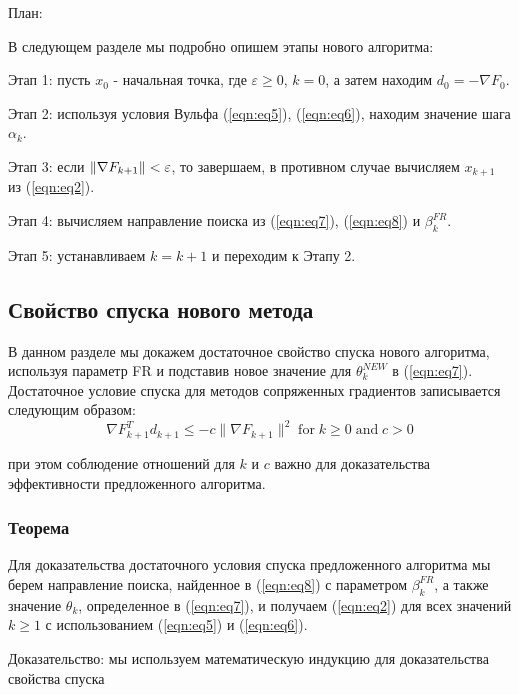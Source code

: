 \noindent План:

\noindent В следующем разделе мы подробно опишем этапы нового алгоритма:

\noindent Этап 1: пусть $x_{0}$ - начальная точка, где $\varepsilon \ge 0$, $k = 0$, 
а затем находим $ d_{0} = -\nabla F_{0} $.

\noindent Этап 2: используя условия Вульфа (\ref{eqn:eq5}), (\ref{eqn:eq6}),
находим значение шага $ \alpha_{k} $.

\noindent Этап 3: если $ \|{\cal \nabla}F_{k+1}\|<\varepsilon $, то завершаем, в
противном случае вычисляем $ x_{k+1} $ из (\ref{eqn:eq2}).

\noindent Этап 4: вычисляем направление поиска из (\ref{eqn:eq7}),
(\ref{eqn:eq8}) и $ \beta_{k}^{FR} $.

\noindent Этап 5: устанавливаем $ k = k + 1 $ и переходим к Этапу 2.

\subsection{Свойство спуска нового метода}

В данном разделе мы докажем достаточное свойство спуска нового алгоритма,
используя параметр FR и подставив новое значение для $\theta_{k}^{NEW}$ в
(\ref{eqn:eq7}). Достаточное условие спуска для методов сопряженных градиентов
записывается следующим образом:
\begin{equation}\label{eqn:eq9}
    \nabla F_{k+1}^{T}d_{k+1}\leq-c\|\nabla F_{k+1}\|^{2}\;\mathrm{for}\;k\geq0\;\mathrm{and}\;c>0
\end{equation}

при этом соблюдение отношений для $k$ и $c$ важно для доказательства
эффективности предложенного алгоритма.

\subsubsection{Теорема}

Для доказательства достаточного условия спуска предложенного алгоритма мы берем
направление поиска, найденное в (\ref{eqn:eq8}) с параметром $\beta_{k}^{FR}$, а
также значение $\theta_{k}$, определенное в (\ref{eqn:eq7}), и получаем
(\ref{eqn:eq2}) для всех значений $k \geq 1$ с использованием (\ref{eqn:eq5}) и
(\ref{eqn:eq6}).

\noindent Доказательство: мы используем математическую индукцию для
доказательства свойства спуска

